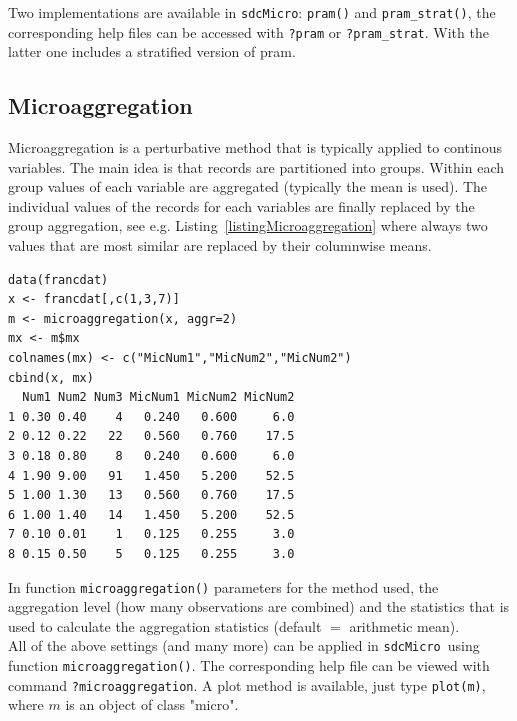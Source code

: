 \documentclass[12pt]{article}
\newcommand{\sdcMicro}{\texttt{sdcMicro}}
\begin{document}
Two implementations are available in \sdcMicro : \lstinline{pram()} and \lstinline{pram_strat()}, 
the corresponding help files can be accessed with \lstinline{?pram} or \lstinline{?pram_strat}. 
With the latter one includes a stratified version of pram.


\subsection{Microaggregation}\label{method:microagg}
Microaggregation is a perturbative method that is typically applied to continous variables. 
The main idea is that records are partitioned into groups. Within each group values of each variable are 
aggregated (typically the mean is used). The individual values of the records for each variables are finally  
replaced by the group aggregation, see e.g. Listing~\ref{listingMicroaggregation} where always two values that are most similar
are replaced by their columnwise means.
\begin{lstlisting}[captionpos=b, caption={Example for microaggregation.}, label=listingMicroaggregation]
data(francdat)
x <- francdat[,c(1,3,7)]
m <- microaggregation(x, aggr=2)
mx <- m$mx
colnames(mx) <- c("MicNum1","MicNum2","MicNum2")
cbind(x, mx)
  Num1 Num2 Num3 MicNum1 MicNum2 MicNum2
1 0.30 0.40    4   0.240   0.600     6.0
2 0.12 0.22   22   0.560   0.760    17.5
3 0.18 0.80    8   0.240   0.600     6.0
4 1.90 9.00   91   1.450   5.200    52.5
5 1.00 1.30   13   0.560   0.760    17.5
6 1.00 1.40   14   1.450   5.200    52.5
7 0.10 0.01    1   0.125   0.255     3.0
8 0.15 0.50    5   0.125   0.255     3.0
\end{lstlisting}

In function \lstinline{microaggregation()}
parameters for the method used, the aggregation level (how many observations are 
combined) and the statistics that is used to calculate the aggregation statistics (default $=$ arithmetic mean).\\ 


All of the above settings (and many more) can be applied in \sdcMicro~using 
function \lstinline{microaggregation()}. The corresponding help file can be 
viewed with command \lstinline{?microaggregation}. A plot method is available, just type 
\lstinline{plot(m)}, where $m$ is an object of class "micro".
\end{document}
